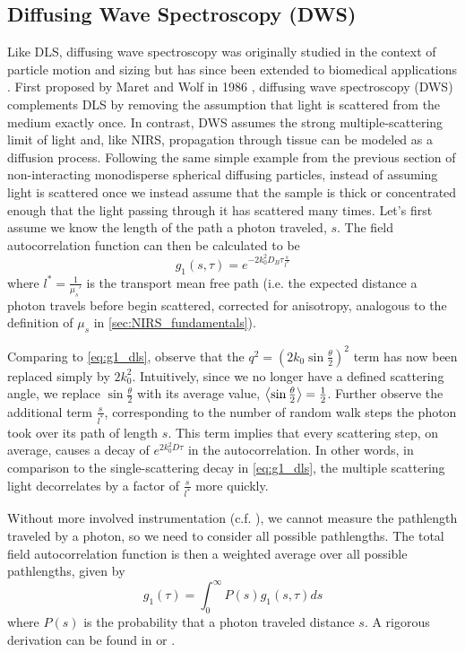 \subsection{Diffusing Wave Spectroscopy (DWS)} \label{sec:DWS}
Like DLS, diffusing wave spectroscopy was originally studied in the context of particle motion and sizing but has since been extended to biomedical applications \cite{Ninck2010}. First proposed by Maret and Wolf in 1986 \cite{Maret1986}, diffusing wave spectroscopy (DWS) complements DLS by removing the assumption that light is scattered from the medium exactly once. In contrast, DWS assumes the strong multiple-scattering limit of light and, like NIRS, propagation through tissue can be modeled as a diffusion process. Following the same simple example from the previous section of non-interacting monodisperse spherical diffusing particles, instead of assuming light is scattered once we instead assume that the sample is thick or concentrated enough that the light passing through it has scattered many times. Let's first assume we know the length of the path a photon traveled, $s$. The field autocorrelation function can then be calculated to be
\begin{equation} \label{eq:g1_pathlength}
g_1(s, \tau) = e^{-2k_0^2D_B\tau\frac{s}{l^*}}
\end{equation}
where $l^* = \frac{1}{\mu_s'}$ is the transport mean free path (i.e. the expected distance a photon travels before begin scattered, corrected for anisotropy, analogous to the definition of $\mu_s$ in \autoref{sec:NIRS_fundamentals}). 

Comparing to \autoref{eq:g1_dls}, observe that the $q^2 = (2k_0\sin\frac{\theta}{2})^2$ term has now been replaced simply by $2k_0^2$. Intuitively, since we no longer have a defined scattering angle, we replace $\sin\frac{\theta}{2}$ with its average value, $\expval{\sin\frac{\theta}{2}} = \frac{1}{2}$. Further observe the additional term $\frac{s}{l^*}$, corresponding to the number of random walk steps the photon took over its path of length $s$. This term implies that every scattering step, on average, causes a decay of $e^{2k_0^2D\tau}$ in the autocorrelation. In other words, in comparison to the single-scattering decay in \autoref{eq:g1_dls}, the multiple scattering light decorrelates by a factor of $\frac{s}{l^*}$ more quickly.  

Without more involved instrumentation (c.f. \cite{Yodh1990}), we cannot measure the pathlength traveled by a photon, so we need to consider all possible pathlengths. The total field autocorrelation function is then a weighted average over all possible pathlengths, given by
\begin{equation}\label{eq:g1_dws}
    g_1(\tau) = \int_{0}^{\infty}P(s) g_1(s, \tau) ds
\end{equation}
where $P(s)$ is the probability that a photon traveled distance $s$. A rigorous derivation can be found in \cite[ch. 16.2.3.1]{Brown1993} or \cite{Pine1990}.

